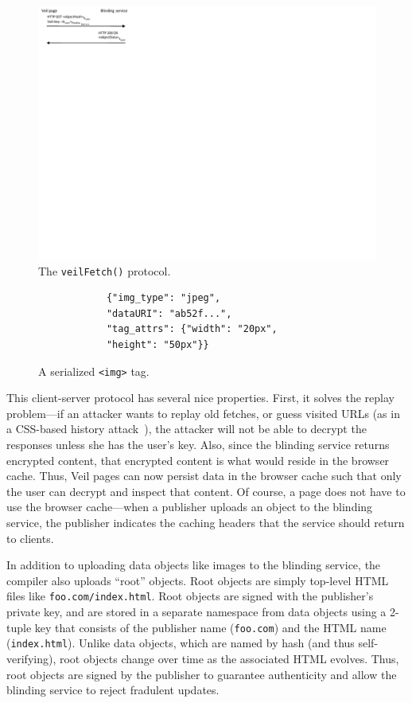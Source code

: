\begin{figure}
	\centering
	\includegraphics{veil-figs/fetchProtocol_cropped}
	\caption{The \texttt{veilFetch()} protocol.}
	\label{fig:fetchProtocol}
\end{figure}

\begin{center}
\begin{figure}
		\begin{BVerbatim}
		    {"img_type": "jpeg",
		    "dataURI": "ab52f...",
		    "tag_attrs": {"width": "20px",
		    "height": "50px"}}
		\end{BVerbatim}	
	\caption{A serialized \texttt{<img>} tag.}
	\label{fig:imgJson}
\end{figure}
\end{center}

This client-server protocol has several nice
properties. First, it solves the replay
problem---if an attacker wants to replay
old fetches, or guess visited URLs (as in a
CSS-based history attack~\cite{cssHistoryAttack,cssHistoryAttack2}),
the attacker will not be able to decrypt the
responses unless she has the user's key. Also,
since the blinding service returns encrypted
content, that encrypted content is what would
reside in the browser cache. Thus, Veil pages
can now persist data in the browser cache
such that only the user can decrypt and inspect
that content. Of course, a page does not have
to use the browser cache---when a publisher
uploads an object to the blinding service,
the publisher indicates the caching headers that the
service should return to clients.

In addition to uploading data objects like
images to the blinding service, the compiler
also uploads ``root'' objects. Root objects
are simply top-level HTML files like \texttt{foo.com/index.html}.
Root objects are signed with the publisher's
private key, and are stored in a separate
namespace from data objects using a 2-tuple
key that consists of the publisher name
(\texttt{foo.com}) and the HTML name
(\texttt{index.html}). Unlike data objects,
which are named by hash (and thus self-verifying),
root objects change over time as the associated
HTML evolves. Thus, root objects are
signed by the publisher to guarantee
authenticity and allow the blinding service
to reject fradulent updates.


